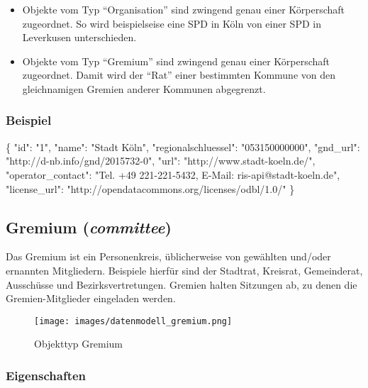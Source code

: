 \documentclass[,a4paper]{article}
\makeatletter
\newenvironment{Shaded}{}{}
\newcommand{\DataTypeTok}[1]{\textcolor[rgb]{0.56,0.13,0.00}{{#1}}}
\newcommand{\StringTok}[1]{\textcolor[rgb]{0.25,0.44,0.63}{{#1}}}
\newcommand{\NormalTok}[1]{{#1}}
\def\maxwidth{\ifdim\Gin@nat@width>\linewidth\linewidth
\else\Gin@nat@width\fi}
\let\Oldincludegraphics\includegraphics
\renewcommand{\includegraphics}[1]{\Oldincludegraphics[width=\maxwidth]{#1}}
\makeatother
\begin{document}
\begin{itemize}
\item
  Objekte vom Typ ``Organisation'' sind zwingend genau einer
  Körperschaft zugeordnet. So wird beispielseise eine SPD in Köln von
  einer SPD in Leverkusen unterschieden.
\item
  Objekte vom Typ ``Gremium'' sind zwingend genau einer Körperschaft
  zugeordnet. Damit wird der ``Rat'' einer bestimmten Kommune von den
  gleichnamigen Gremien anderer Kommunen abgegrenzt.
\end{itemize}

\subsubsection{Beispiel}

\begin{Shaded}
\begin{Highlighting}[]
\NormalTok{\{}
    \DataTypeTok{"id"}\NormalTok{: }\StringTok{"1"}\NormalTok{,}
    \DataTypeTok{"name"}\NormalTok{: }\StringTok{"Stadt Köln"}\NormalTok{,}
    \DataTypeTok{"regionalschluessel"}\NormalTok{: }\StringTok{"053150000000"}\NormalTok{,}
    \DataTypeTok{"gnd_url"}\NormalTok{: }\StringTok{"http://d-nb.info/gnd/2015732-0"}\NormalTok{,}
    \DataTypeTok{"url"}\NormalTok{: }\StringTok{"http://www.stadt-koeln.de/"}\NormalTok{,}
    \DataTypeTok{"operator_contact"}\NormalTok{: }\StringTok{"Tel. +49 221-221-5432, E-Mail: ris-api@stadt-koeln.de"}\NormalTok{,}
    \DataTypeTok{"license_url"}\NormalTok{: }\StringTok{"http://opendatacommons.org/licenses/odbl/1.0/"}
\NormalTok{\}}
\end{Highlighting}
\end{Shaded}

\subsection{Gremium (\emph{committee})}

Das Gremium ist ein Personenkreis, üblicherweise von gewählten und/oder
ernannten Mitgliedern. Beispiele hierfür sind der Stadtrat, Kreisrat,
Gemeinderat, Ausschüsse und Bezirksvertretungen. Gremien halten
Sitzungen ab, zu denen die Gremien-Mitglieder eingeladen werden.

\begin{figure}[htbp]
\centering
\texttt{[image: images/datenmodell\_gremium.png]}
\caption{Objekttyp Gremium}
\end{figure}

\subsubsection{Eigenschaften}
\end{document}
